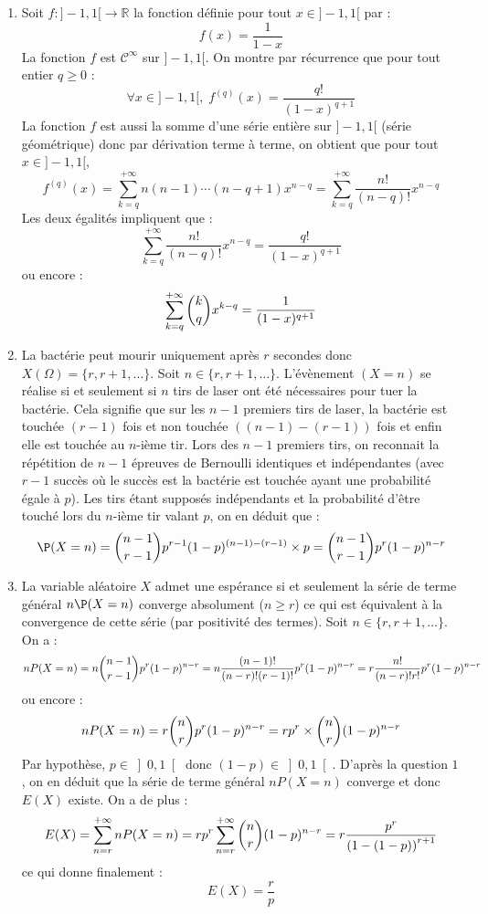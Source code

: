 \documentclass[a4paper,10pt]{report}
\begin{document}
\begin{enumerate}
\item Soit $f : ]-1,1[ \rightarrow \mathbb{R}$ la fonction définie pour tout $x \in ]-1,1[$ par :
$$ f(x) = \dfrac{1}{1-x}$$
La fonction $f$ est $\mathcal{C}^{\infty}$ sur $]-1,1[$. On montre par récurrence que pour tout entier $q \geq 0$ :
$$ \forall x \in ]-1,1[, \; f^{(q)}(x) = \dfrac{q!}{(1-x)^{q+1}}$$
La fonction $f$ est aussi la somme d'une série entière sur $]-1,1[$ (série géométrique) donc par dérivation terme à terme, on obtient que pour tout $x \in ]-1,1[$,
$$ f^{(q)}(x) = \sum_{k=q}^{+ \infty} n(n-1) \cdots (n-q+1) x^{n-q} = \sum_{k=q}^{+ \infty} \dfrac{n!}{(n-q)!} x^{n-q}$$
Les deux égalités impliquent que :
$$ \sum_{k=q}^{+ \infty} \dfrac{n!}{(n-q)!} x^{n-q} = \dfrac{q!}{(1-x)^{q+1}}$$
ou encore :
$$ \sum\limits_{k=q}^{+\infty}\dbinom{k}{q}x^{k-q}=\dfrac{1}{(1-x)^{q+1}}$$
\item La bactérie peut mourir uniquement après $r$ secondes donc $X(\Omega)=\lbrace r, r+1, \ldots \rbrace$. Soit $n\in \lbrace r, r+1, \ldots \rbrace$. L'évènement $(X=n)$ se réalise si et seulement si $n$ tirs de laser ont été nécessaires pour tuer la bactérie. Cela signifie que sur les $n-1$ premiers tirs de laser, la bactérie est  touchée $(r-1)$ fois et non touchée  $\left( (n-1)-(r-1)\right)$ fois et enfin elle est touchée au $n$-ième tir. Lors des $n-1$ premiers tirs, on reconnait la répétition de $n-1$ épreuves de Bernoulli identiques et indépendantes (avec $r-1$ succès où le succès est \og la bactérie est touchée \fg ayant une probabilité égale à $p$). Les tirs étant supposés indépendants et la probabilité d'être touché lors du $n$-ième tir valant $p$, on en déduit que :
$$\P(X=n)=\dbinom{n-1}{r-1}p^{r-1}(1-p)^{(n-1)-(r-1)}\times p = \dbinom{n-1}{r-1}p^{r}(1-p)^{n-r}$$
\item La variable aléatoire $X$ admet une espérance si et seulement la série de terme général $n \P(X=n)$ converge absolument ($n \geq r$) ce qui est équivalent à la convergence de cette série (par positivité des termes). Soit $n\in \lbrace r, r+1, \ldots \rbrace$. On a :
$$nP(X=n)=n\dbinom{n-1}{r-1}p^{r}(1-p)^{n-r}=n\dfrac{(n-1)!}{(n-r)!(r-1)!}p^{r}(1-p)^{n-r}=r\dfrac{n!}{(n-r)!r!}p^{r}(1-p)^{n-r}$$
ou encore :
$$nP(X=n)=r \dbinom{n}{r}p^{r}(1-p)^{n-r} = rp^r \times \dbinom{n}{r} (1-p)^{n-r}$$
Par hypothèse, $p\in \left]0,1 \right[$ donc $(1-p)\in \left]0,1 \right[$. D'après la question $1$, on en déduit que la série de terme général $nP(X=n)$ converge et donc $E(X)$ existe. On a de plus :
$$E(X)=\displaystyle\sum\limits_{n= r}^{+\infty} nP(X=n)=r p^r\displaystyle\sum\limits_{n= r}^{+\infty}\dbinom{n}{r}(1-p)^{n-r}
=r \dfrac{p^r}{\left( 1-(1-p)\right)^{r+1} } $$
ce qui donne finalement :
$$E(X)=\dfrac{r}{p}$$
\end{enumerate}
\end{document}
